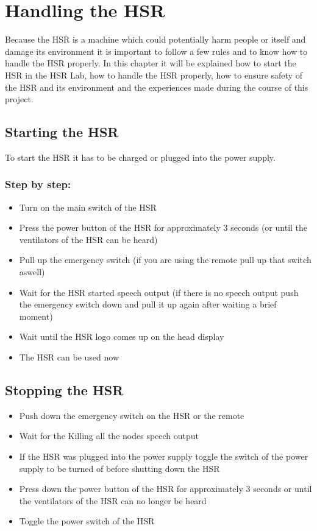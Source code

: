 \documentclass[main.tex]{subfiles}
\begin{document}
	\chapter{Handling the HSR}
	\label{workin_hsr}
	
	Because the HSR is a machine which could potentially harm people or itself and damage its environment it is important to follow a few rules and to know how to handle the HSR properly. In this chapter it will be explained how to start the HSR in the HSR Lab, how to handle the HSR properly, how to ensure safety of the HSR and its environment and the experiences made during the course of this project.

	\section{Starting the HSR}
	To start the HSR it has to be charged or plugged into the power supply.
	\subsection{Step by step:}
	\begin{itemize}
		\item Turn on the main switch of the HSR
		\item Press the power button of the HSR for approximately 3 seconds (or until the ventilators of the HSR can be heard)
		\item Pull up the emergency switch (if you are using the remote pull up that switch aswell)
		\item Wait for the HSR started speech output (if there is no speech output push the emergency switch down and pull it up again after waiting a brief moment)
		\item Wait until the HSR logo comes up on the head display
		\item The HSR can be used now
	\end{itemize}
	\section{Stopping the HSR}
	\begin{itemize}
		\item Push down the emergency switch on the HSR or the remote
		\item Wait for the Killing all the nodes speech output
		\item If the HSR was plugged into the power supply toggle the switch of the power supply to be turned of before shutting down the HSR
		\item Press down the power button of the HSR for approximately 3 seconds or until the ventilators of the HSR can no longer be heard
		\item Toggle the power switch of the HSR
	\end{itemize}
\end{document}
